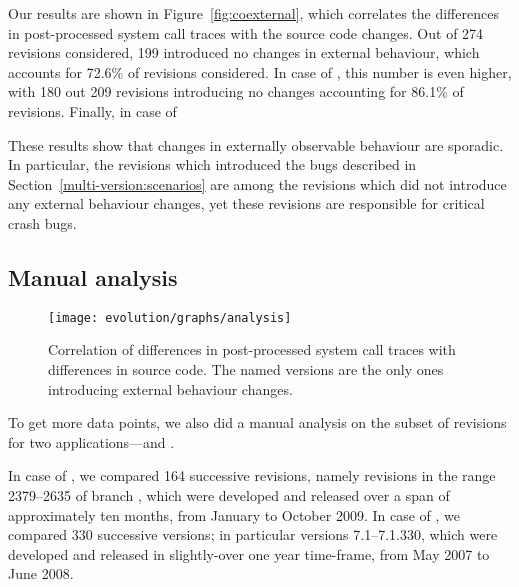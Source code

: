 Our results are shown in Figure~\ref{fig:coexternal}, which correlates the
differences in post-processed system call traces with the source code changes.
Out of 274 \lighttpd revisions considered, 199 introduced no changes in
external behaviour, which accounts for 72.6\% of revisions considered. In case
of \lighttpdtwo, this number is even higher, with 180 out 209 revisions
introducing no changes accounting for 86.1\% of revisions. Finally, in case of

These results show that changes in externally observable behaviour are
sporadic. In particular, the revisions which introduced the bugs described in
Section~\ref{multi-version:scenarios} are among the revisions which did not
introduce any external behaviour changes, yet these revisions are responsible
for critical crash bugs.

\subsection{Manual analysis}

\begin{figure}[t]
  \begin{center}
    \texttt{[image: evolution/graphs/analysis]}
    \caption{Correlation of differences in post-processed system call traces
      with differences in source code. The named versions are the only ones
      introducing external behaviour changes.}
    \label{fig:coanalysis}
  \end{center}
\end{figure}

To get more data points, we also did a manual analysis on the subset of revisions
for two applications---\lighttpd and \vim.

In case of \lighttpd, we compared 164 successive revisions, namely revisions in
the range 2379--2635 of branch , which were developed
and released over a span of approximately ten months, from January to October
2009. In case of \vim, we compared 330 successive versions; in particular
versions 7.1--7.1.330, which were developed and released in slightly-over one
year time-frame, from May 2007 to June 2008.


